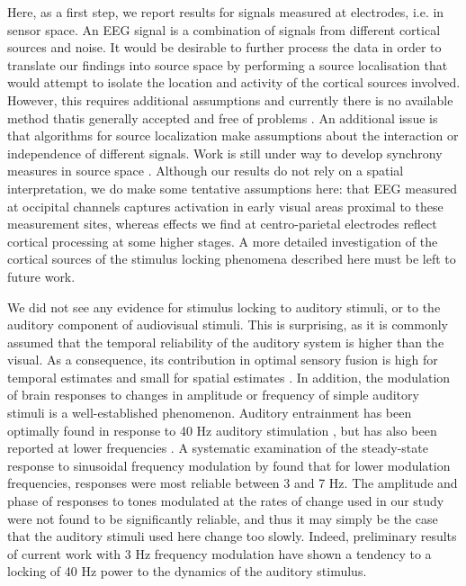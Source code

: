 Here, as a first step, we report results for signals measured at
electrodes, i.e. in sensor space. An EEG signal is a combination of signals
from different cortical sources and noise. It would be desirable to further
process the data in order to translate our findings into source space by
performing a source localisation that would attempt to isolate the location
and activity of the cortical sources involved. However, this requires
additional assumptions and currently there is no available method
that\textemdash is generally accepted and free of problems
\citep{nunez1981a}. An additional issue is that algorithms for source
localization make assumptions about the interaction or independence of
different signals.  Work is still under way to develop synchrony measures
in source space \citep[e.g.][]{marzetti2008a}. Although our results do not
rely on a spatial interpretation, we do make some tentative assumptions
here: that EEG measured at occipital channels captures activation in early
visual areas proximal to these measurement sites, whereas effects we find
at centro-parietal electrodes reflect cortical processing at some higher
stages. A more detailed investigation of the cortical sources of the
stimulus locking phenomena described here must be left to future work. 



We did not see any evidence for stimulus locking to auditory stimuli, or to
the auditory component of audiovisual stimuli. This is surprising, as it is
commonly assumed that the temporal reliability of the auditory system is
higher than the visual. As a consequence, its contribution in optimal
sensory fusion is high for temporal estimates
\citep[e.g.][]{bresciani2008a} and small for spatial estimates
\citep[e.g.][]{Kording2007a}.  In addition, the modulation of brain
responses to changes in amplitude or frequency of simple auditory stimuli
is a well-established phenomenon.  Auditory entrainment has been optimally
found in response to 40 Hz auditory stimulation \citep{galambos1981a}, but
has also been reported at lower frequencies \citep[e.g.][]{ding2006a}. A
systematic examination of the steady-state response to sinusoidal frequency
modulation by \cite{picton1987a} found that for lower modulation
frequencies, responses were most reliable between 3 and 7 Hz. The amplitude
and phase of responses to tones modulated at the rates of change used in
our study were not found to be significantly reliable, and thus it may
simply be the case that the auditory stimuli used here change too slowly.
Indeed, preliminary results of current work with 3 Hz frequency modulation
have shown a tendency to a locking of 40 Hz power to the dynamics of the
auditory stimulus.



